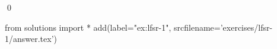
\begin{ex} 
  \label{ex:lfsr-1}
  
  \qed
\end{ex} 
\begin{python0}
from solutions import *
add(label="ex:lfsr-1",
    srcfilename='exercises/lfsr-1/answer.tex') 
\end{python0}
